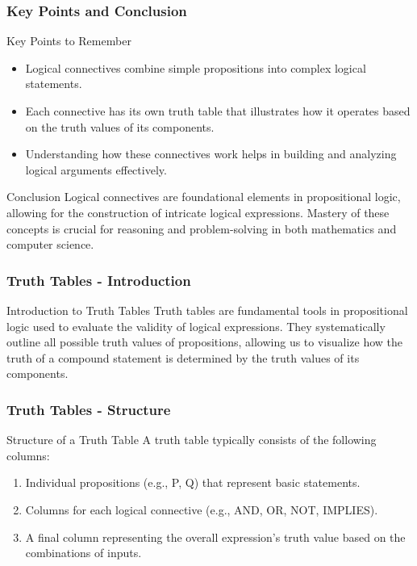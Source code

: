 \documentclass[aspectratio=169]{beamer}
\begin{document}
\begin{frame}[fragile]
    \frametitle{Key Points and Conclusion}
    \begin{block}{Key Points to Remember}
        \begin{itemize}
            \item Logical connectives combine simple propositions into complex logical statements.
            \item Each connective has its own truth table that illustrates how it operates based on the truth values of its components.
            \item Understanding how these connectives work helps in building and analyzing logical arguments effectively.
        \end{itemize}
    \end{block}
    \begin{block}{Conclusion}
        Logical connectives are foundational elements in propositional logic, allowing for the construction of intricate logical expressions. Mastery of these concepts is crucial for reasoning and problem-solving in both mathematics and computer science.
    \end{block}
\end{frame}

\begin{frame}[fragile]
    \frametitle{Truth Tables - Introduction}
    \begin{block}{Introduction to Truth Tables}
        Truth tables are fundamental tools in propositional logic used to evaluate 
        the validity of logical expressions. They systematically outline all possible 
        truth values of propositions, allowing us to visualize how the truth of a 
        compound statement is determined by the truth values of its components.
    \end{block}
\end{frame}

\begin{frame}[fragile]
    \frametitle{Truth Tables - Structure}
    \begin{block}{Structure of a Truth Table}
        A truth table typically consists of the following columns:
        \begin{enumerate}
            \item Individual propositions (e.g., P, Q) that represent basic statements.
            \item Columns for each logical connective (e.g., AND, OR, NOT, IMPLIES).
            \item A final column representing the overall expression’s truth value based on the combinations of inputs.
        \end{enumerate}
    \end{block}
\end{frame}
\end{document}
